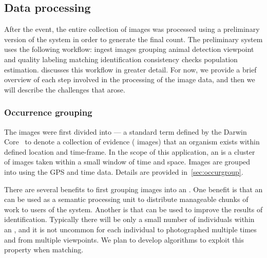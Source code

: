     \subsection{Data processing}\label{subsec:introdataprocess}

        After the event, the entire collection of images was processed
          using a preliminary version of the system in order to generate
          the final count.
        The preliminary system uses the following workflow:
        ingest images \rpipe{} %
        \occurrence{} grouping \rpipe{} %
        animal detection \rpipe{} %
        viewpoint and quality labeling \rpipe{} %
        \intraoccurrence{} matching \rpipe{} %
        \vsexemplar{} identification \rpipe{} %
        consistency checks \rpipe{} %
        population estimation.
         discusses this workflow in greater
          detail.
        For now, we provide a brief overview of each step involved in
          the processing of the \GZC{} image data, and then we will
          describe the challenges that arose.

        \subsubsection{Occurrence grouping}
            The images were first divided into
              \glossterm{\occurrences{}} --- a standard term defined by
              the Darwin Core~\cite{wieczorek_darwin_2012} to denote a
              collection of evidence (\eg{} images) that an organism
              exists within defined location and time-frame.
            In the scope of this application, an \occurrence{} is a
              cluster of images taken within a small window of time and
              space.
            Images are grouped into \occurrences{} using the GPS and
              time data.
            Details are provided in~\cref{sec:occurgroup}.

            There are several benefits to first grouping images into an
              \occurrence{}.
            One benefit is that an \occurrence{} can be used as a
              semantic processing unit to distribute manageable chunks of
              work to users of the system.
            Another is that \occurrences{} can be used to improve the
              results of identification.
            Typically there will be only a small number of individuals
              within an \occurrence{}, and it is not uncommon for each
              individual to photographed multiple times and from multiple
              viewpoints.
            We plan to develop algorithms to exploit this property when
              matching.

